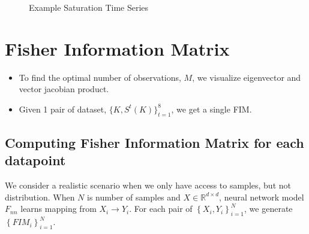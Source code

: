 \documentclass[
]{article}
\providecommand{\tightlist}{%
  \setlength{\itemsep}{0pt}\setlength{\parskip}{0pt}}\usepackage{longtable,booktabs,array}
\begin{document}
\begin{figure}

\begin{minipage}{\linewidth}



\end{minipage}%
\newline
\begin{minipage}{\linewidth}



\end{minipage}%

\caption{\label{fig-S}Example Saturation Time Series}

\end{figure}%

\section{Fisher Information Matrix}\label{fisher-information-matrix}

\begin{itemize}
\tightlist
\item
  To find the optimal number of observations, \(M\), we visualize
  eigenvector and vector jacobian product.
\item
  Given 1 pair of dataset, \(\{K, S^t(K)\}^8_{t=1}\), we get a single
  FIM.
\end{itemize}

\subsection{Computing Fisher Information Matrix for each
datapoint}\label{computing-fisher-information-matrix-for-each-datapoint}

We consider a realistic scenario when we only have access to samples,
but not distribution. When \(N\) is number of samples and
\(X \in \mathbb{R}^{d \times d}\), neural network model \(F_{nn}\)
learns mapping from \(X_i \rightarrow Y_i\). For each pair of
\(\left\{X_i, Y_i \right\}^N_{i=1}\), we generate
\(\left\{FIM_i\right\}_{i=1}^{N}\).
\end{document}

